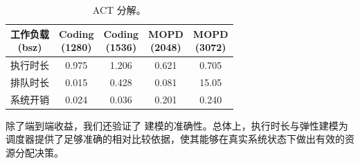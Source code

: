\begin{table}[!t]
\centering
\begin{tabular}{c|cccc}
\toprule
\makecell[c]{\textbf{工作负载} \\ (bsz)} &
\makecell[c]{\textbf{Coding} \\ (1280)} &
\makecell[c]{\textbf{Coding} \\ (1536)} &
\makecell[c]{\textbf{MOPD} \\ (2048)} &
\makecell[c]{\textbf{MOPD} \\ (3072)} \\
\midrule
执行时长                & 0.975 & 1.206 & 0.621 & 0.705 \\
排队时长               & 0.015 & 0.428 & 0.081 & 15.05 \\
系统开销            & 0.024 & 0.036 & 0.201 & 0.240 \\
\bottomrule
\end{tabular}
\caption{ACT 分解。}
\label{table:overhead}
\vspace{-0.2in}
\end{table}

除了端到端收益，我们还验证了 \sysname 建模的准确性。总体上，执行时长与弹性建模为调度器提供了足够准确的相对比较依据，使其能够在真实系统状态下做出有效的资源分配决策。
